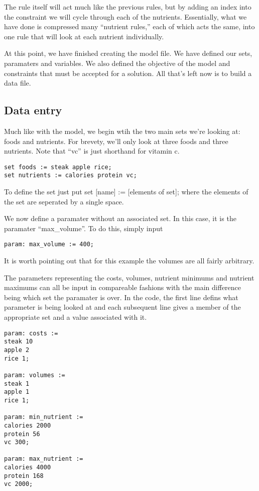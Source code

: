 \documentclass{article}
\begin{document}
The rule itself will act much like the previous rules, but by adding an index into the constraint we will cycle through each of the nutrients.  Essentially, what we have done is compressed many ``nutrient rules,'' each of which acts the same, into one rule that will look at each nutrient individually.

At this point, we have finished creating the model file.  We have defined our sets, paramaters and variables.  We also defined the objective of the model and constraints that must be accepted for a solution.  All that's left now is to build a data file.


\subsection*{Data entry}

Much like with the model, we begin wtih the two main sets we're looking at: foods and nutrients.  For brevety, we'll only look at three foods and three nutrients.  Note that ``vc'' is just shorthand for vitamin c.

\begin{verbatim}
set foods := steak apple rice;
set nutrients := calories protein vc;
\end{verbatim}

To define the set just put set [name] := [elements of set]; where the elements of the set are seperated by a single space.

We now define a paramater without an associated set.  In this case, it is the paramater ``max\_volume''.  To do this, simply input

\begin{verbatim}
param: max_volume := 400;
\end{verbatim}

\noindent
It is worth pointing out that for this example the volumes are all fairly arbitrary.

The parameters representing the costs, volumes, nutrient minimums and nutrient maximums can all be input in compareable fashions with the main difference being which set the paramater is over.  In the code, the first line defins what parameter is being looked at and each subsequent line gives a member of the appropriate set and a value associated with it.

\begin{verbatim}
param: costs :=
steak 10
apple 2
rice 1;

param: volumes :=
steak 1
apple 1
rice 1;

param: min_nutrient :=
calories 2000
protein 56
vc 300;

param: max_nutrient :=
calories 4000
protein 168
vc 2000;
\end{verbatim}
\end{document}
